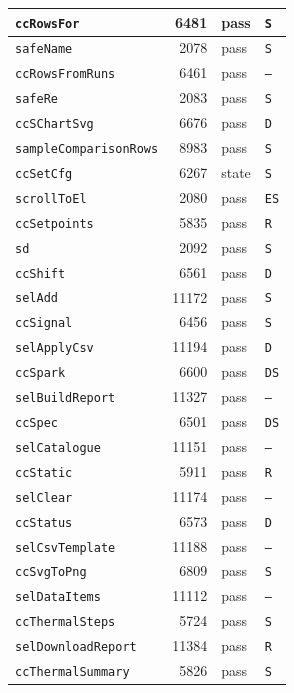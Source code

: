 {\begin{xltabular}{\linewidth}{|l|r|X|X|}
\texttt{ccRowsFor} & 6481 & pass & \texttt{S} \\ \hline
\texttt{safeName} & 2078 & pass & \texttt{S} \\ \hline
\texttt{ccRowsFromRuns} & 6461 & pass & \texttt{--} \\ \hline
\texttt{safeRe} & 2083 & pass & \texttt{S} \\ \hline
\texttt{ccSChartSvg} & 6676 & pass & \texttt{D} \\ \hline
\texttt{sampleComparisonRows} & 8983 & pass & \texttt{S} \\ \hline
\texttt{ccSetCfg} & 6267 & state & \texttt{S} \\ \hline
\texttt{scrollToEl} & 2080 & pass & \texttt{ES} \\ \hline
\texttt{ccSetpoints} & 5835 & pass & \texttt{R} \\ \hline
\texttt{sd} & 2092 & pass & \texttt{S} \\ \hline
\texttt{ccShift} & 6561 & pass & \texttt{D} \\ \hline
\texttt{selAdd} & 11172 & pass & \texttt{S} \\ \hline
\texttt{ccSignal} & 6456 & pass & \texttt{S} \\ \hline
\texttt{selApplyCsv} & 11194 & pass & \texttt{D} \\ \hline
\texttt{ccSpark} & 6600 & pass & \texttt{DS} \\ \hline
\texttt{selBuildReport} & 11327 & pass & \texttt{--} \\ \hline
\texttt{ccSpec} & 6501 & pass & \texttt{DS} \\ \hline
\texttt{selCatalogue} & 11151 & pass & \texttt{--} \\ \hline
\texttt{ccStatic} & 5911 & pass & \texttt{R} \\ \hline
\texttt{selClear} & 11174 & pass & \texttt{--} \\ \hline
\texttt{ccStatus} & 6573 & pass & \texttt{D} \\ \hline
\texttt{selCsvTemplate} & 11188 & pass & \texttt{--} \\ \hline
\texttt{ccSvgToPng} & 6809 & pass & \texttt{S} \\ \hline
\texttt{selDataItems} & 11112 & pass & \texttt{--} \\ \hline
\texttt{ccThermalSteps} & 5724 & pass & \texttt{S} \\ \hline
\texttt{selDownloadReport} & 11384 & pass & \texttt{R} \\ \hline
\texttt{ccThermalSummary} & 5826 & pass & \texttt{S} \\ \hline

\end{xltabular}}
